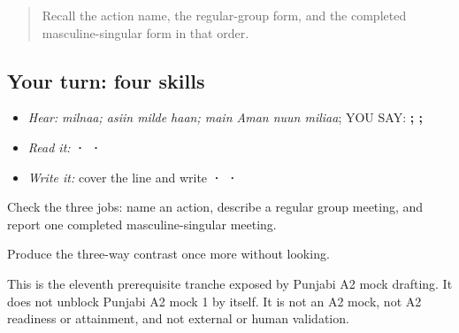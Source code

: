 \begin{quote}
Recall the action name, the regular-group form, and the completed masculine-singular form in that order.
\end{quote}

\subsection*{Your turn: four skills}
\begin{itemize}
\raggedright
  \item \emph{Hear:} \emph{milnaa; asiin milde haan; main Aman nuun miliaa}; YOU SAY: \textbf{;   ;    }
  \item \emph{Read it:} \textbf{ ·    ·    }
  \item \emph{Write it:} cover the line and write \textbf{ ·  · }
\end{itemize}

Check the three jobs: name an action, describe a regular group meeting, and report one completed masculine-singular meeting.

\begin{tcolorbox}[breakable,colback=teal!4,colframe=teal!35!black,title={Before you move on}]
Produce the three-way contrast once more without looking.

This is the eleventh prerequisite tranche exposed by Punjabi A2 mock drafting. It does not unblock Punjabi A2 mock 1 by itself. It is not an A2 mock, not A2 readiness or attainment, and not external or human validation.
\end{tcolorbox}
